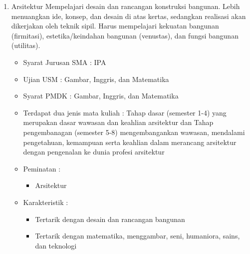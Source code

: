 \documentclass[a4paper,twoside]{article}
\begin{document}
\begin{enumerate}
\begin{enumerate}
\begin{enumerate}
				\item Arsitektur
					Mempelajari desain dan rancangan konstruksi bangunan. Lebih menuangkan ide, konsep, dan desain di atas kertas, sedangkan realisasi akan dikerjakan oleh teknik sipil. Harus mempelajari kekuatan bangunan (firmitasi), estetika/keindahan bangunan (venustas), dan fungsi bangunan (utilitas).
					\begin{itemize}
						\item Syarat Jurusan SMA : IPA
						\item Ujian USM : Gambar, Inggris, dan Matematika
						\item Syarat PMDK : Gambar, Inggris, dan Matematika
						\item Terdapat dua jenis mata kuliah : Tahap dasar (semester 1-4) yang merupakan dasar wawasan dan keahlian arsitektur dan Tahap pengembanagan (semester 5-8) mengembangankan wawasan, mendalami pengetahuan, kemampuan serta keahlian dalam merancang arsitektur dengan pengenalan ke dunia profesi arsitektur
						\item Peminatan :
						\begin{itemize}
							\item Arsitektur
						\end{itemize}
						\item Karakteristik :
						\begin{itemize}
							\item Tertarik dengan desain dan rancangan bangunan
							\item Tertarik dengan matematika, menggambar, seni, humaniora, sains, dan teknologi
						\end{itemize}
					\end{itemize}
			\end{enumerate}
			

\end{enumerate}
\end{enumerate}
\end{document}
